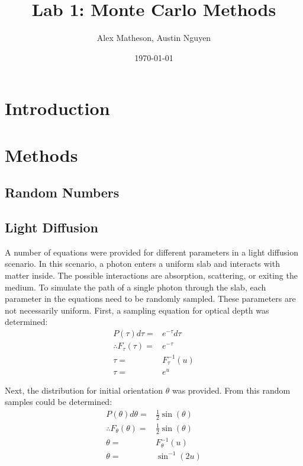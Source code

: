 \documentclass[twocolumn]{article}
\begin{document}
\title{Lab 1: Monte Carlo Methods}
\author{Alex Matheson, Austin Nguyen}
\date{\today}
\maketitle

\section{Introduction}

\section{Methods}
\subsection{Random Numbers}


\subsection{Light Diffusion}
A number of equations were provided for different parameters in a light diffusion scenario. In this scenario, a photon enters a uniform slab and interacts with matter inside. The possible interactions are absorption, scattering, or exiting the medium. To simulate the path of a single photon through the slab, each parameter in the equations need to be randomly sampled. These parameters are not necessarily uniform. First, a sampling equation for optical depth was determined:
\begin{equation}
\begin{split}
P(\tau) d\tau =& e^{-\tau} d\tau \\
\therefore F_{\tau}(\tau) =& e^{-\tau} \\
\tau =& F^{-1}_{\tau}(u) \\
\tau =& e^{u}
\end{split}
\end{equation}

Next, the distribution for initial orientation $\theta$ was provided. From this random samples could be determined:
\begin{equation}
\begin{split}
P(\theta) d\theta =& \frac{1}{2} \sin(\theta) \\
\therefore F_{\theta}(\theta) =& \frac{1}{2} \sin(\theta)\\
\theta =& F^{-1}_{\theta}(u) \\
\theta =& \sin^{-1}(2u)
\end{split}
\end{equation}
\end{document}
